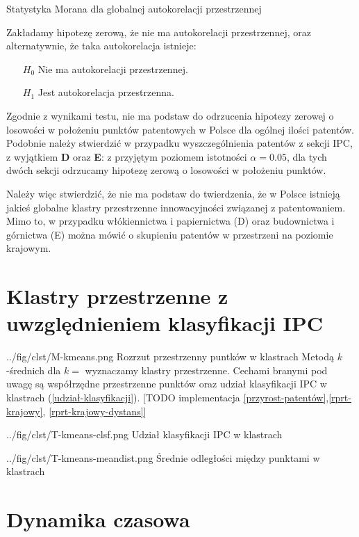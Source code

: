 { Statystyka Morana dla globalnej 
  autokorelacji przestrzennej }
{
  Zakładamy hipotezę zerową, że nie ma autokorelacji przestrzennej, oraz
alternatywnie, że taka autokorelacja istnieje:
\begin{itemize}
\item[$H_0$] Nie ma autokorelacji przestrzennej.
\item[$H_1$] Jest autokorelacja przestrzenna.
\end{itemize}}

Zgodnie z wynikami testu, nie ma podstaw do odrzucenia hipotezy zerowej
o losowości w położeniu punktów patentowych w Polsce dla ogólnej ilości patentów.
Podobnie należy stwierdzić w przypadku wyszczególnienia patentów z sekcji \ac{IPC},
z wyjątkiem \textbf{D} oraz \textbf{E}: z przyjętym poziomem istotności $\alpha=0.05$,
dla tych dwóch sekcji odrzucamy hipotezę zerową o losowości w położeniu punktów.

Należy więc stwierdzić, że nie ma podstaw do twierdzenia, że w Polsce istnieją
jakieś globalne klastry przestrzenne innowacyjności związanej z patentowaniem.
Mimo to, w przypadku włókiennictwa i papiernictwa (D) oraz 
budownictwa i górnictwa (E) można mówić o skupieniu patentów w przestrzeni
na poziomie krajowym.





    \newpage\section
  {Klastry przestrzenne z uwzględnieniem klasyfikacji \ac{IPC}}

  \figside
{../fig/clst/M-kmeans.png}
{Rozrzut przestrzenny puntków w klastrach}
{
Metodą $k$-średnich dla $k=$ wyznaczamy klastry przestrzenne. 
Cechami branymi pod uwagę są współrzędne przestrzenne punktów oraz
udział klasyfikacji \ac{IPC} w klastrach (\cref{udział-klasyfikacji}). 
[TODO implementacja \cref{przyrost-patentów},\cref{rprt-krajowy},
\cref{rprt-krajowy-dystans}]
}

\tblside
{../fig/clst/T-kmeans-clsf.png}
{Udział klasyfikacji \ac{IPC} w klastrach}

\tblside
{../fig/clst/T-kmeans-meandist.png}
{Średnie odległości między punktami w klastrach}




    \newpage\section{Dynamika czasowa}


